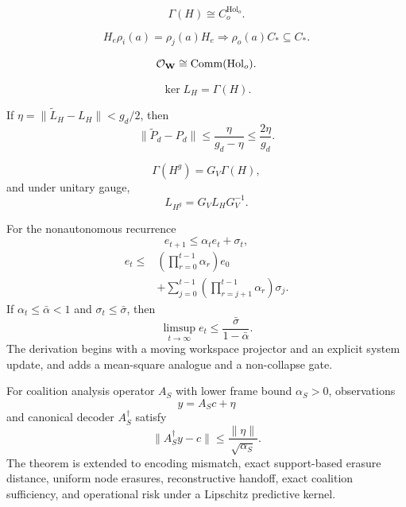 

\[
\Gamma(H)\cong C_o^{\operatorname{Hol}_o}.
\]

\[
H_e\rho_i(a)=\rho_j(a)H_e
\Longrightarrow
\rho_o(a)C_*\subseteq C_*.
\]

\[
\mathcal O_{\mathbf W}
\cong
\operatorname{Comm}(\operatorname{Hol}_o).
\]

\[
\ker L_H=\Gamma(H).
\]

If \(\eta=\|\widetilde L_H-L_H\|<g_d/2\), then
\[
\|\widetilde P_d-P_d\|
\leq
\frac{\eta}{g_d-\eta}
\leq
\frac{2\eta}{g_d}.
\]

\[
\Gamma(H^g)=G_V\Gamma(H),
\]
and under unitary gauge,
\[
L_{H^g}=G_VL_HG_V^{-1}.
\]


For the nonautonomous recurrence
\[
e_{t+1}\leq\alpha_te_t+\sigma_t,
\]
\[
\boxed{
\begin{aligned}
e_t
\leq
&\left(\prod_{r=0}^{t-1}\alpha_r\right)e_0\\
&+\sum_{j=0}^{t-1}
\left(\prod_{r=j+1}^{t-1}\alpha_r\right)\sigma_j.
\end{aligned}
}
\]
If \(\alpha_t\leq\bar\alpha<1\) and \(\sigma_t\leq\bar\sigma\), then
\[
\limsup_{t\to\infty}e_t
\leq
\frac{\bar\sigma}{1-\bar\alpha}.
\]
The derivation begins with a moving workspace projector and
an explicit system update, and adds a mean-square analogue and a non-collapse
gate.


For coalition analysis operator \(A_S\) with lower frame bound
\(\alpha_S>0\), observations
\[
y=A_Sc+\eta
\]
and canonical decoder \(A_S^\dagger\) satisfy
\[
\boxed{
\|A_S^\dagger y-c\|
\leq
\frac{\|\eta\|}{\sqrt{\alpha_S}}.
}
\]
The theorem is extended to encoding mismatch, exact support-based erasure
distance, uniform node erasures, reconstructive handoff, exact coalition
sufficiency, and operational risk under a Lipschitz predictive kernel.

